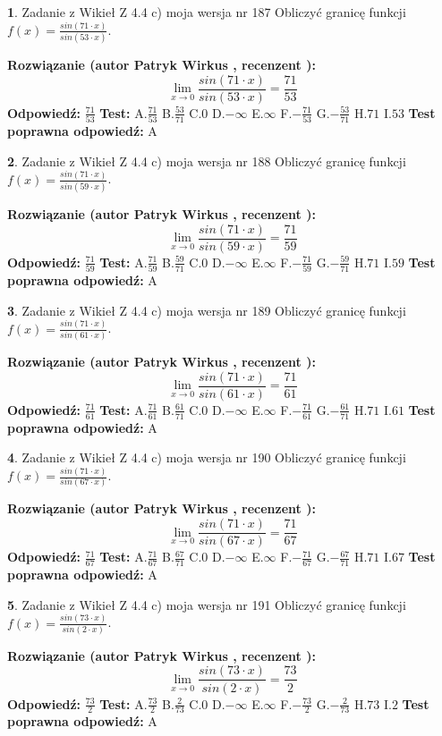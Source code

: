 \documentclass[12pt, a4paper]{article}
\theoremstyle{definition} %
\newtheorem{zad}{}
\newcommand{\zadStart}[1]{\begin{zad}#1\newline}
\newcommand{\zadStop}{\end{zad}}
\newcommand{\rozwStart}[2]{\noindent \textbf{Rozwiązanie (autor #1 , recenzent #2): }\newline}
\newcommand{\rozwStop}{\newline}
\newcommand{\odpStart}{\noindent \textbf{Odpowiedź:}\newline}
\newcommand{\odpStop}{\newline}
\newcommand{\testStart}{\noindent \textbf{Test:}\newline}
\newcommand{\testStop}{\newline}
\newcommand{\kluczStart}{\noindent \textbf{Test poprawna odpowiedź:}\newline}
\newcommand{\kluczStop}{\newline}
\begin{document}
\zadStart{Zadanie z Wikieł Z 4.4 c) moja wersja nr 187}
Obliczyć granicę funkcji $f(x)=\frac{sin(71\cdot x)}{sin(53\cdot x)}$.
\zadStop
\rozwStart{Patryk Wirkus}{}
$$\lim\limits_{x\to 0}\frac{sin(71\cdot x)}{sin(53\cdot x)}=
\frac{71}{53}$$
\rozwStop
\odpStart
$\frac{71}{53}$
\odpStop
\testStart
A.$\frac{71}{53}$
B.$\frac{53}{71}$
C.$0$
D.$-\infty$
E.$\infty$
F.$-\frac{71}{53}$
G.$-\frac{53}{71}$
H.$71$
I.$53$
\testStop
\kluczStart
A
\kluczStop



\zadStart{Zadanie z Wikieł Z 4.4 c) moja wersja nr 188}
Obliczyć granicę funkcji $f(x)=\frac{sin(71\cdot x)}{sin(59\cdot x)}$.
\zadStop
\rozwStart{Patryk Wirkus}{}
$$\lim\limits_{x\to 0}\frac{sin(71\cdot x)}{sin(59\cdot x)}=
\frac{71}{59}$$
\rozwStop
\odpStart
$\frac{71}{59}$
\odpStop
\testStart
A.$\frac{71}{59}$
B.$\frac{59}{71}$
C.$0$
D.$-\infty$
E.$\infty$
F.$-\frac{71}{59}$
G.$-\frac{59}{71}$
H.$71$
I.$59$
\testStop
\kluczStart
A
\kluczStop



\zadStart{Zadanie z Wikieł Z 4.4 c) moja wersja nr 189}
Obliczyć granicę funkcji $f(x)=\frac{sin(71\cdot x)}{sin(61\cdot x)}$.
\zadStop
\rozwStart{Patryk Wirkus}{}
$$\lim\limits_{x\to 0}\frac{sin(71\cdot x)}{sin(61\cdot x)}=
\frac{71}{61}$$
\rozwStop
\odpStart
$\frac{71}{61}$
\odpStop
\testStart
A.$\frac{71}{61}$
B.$\frac{61}{71}$
C.$0$
D.$-\infty$
E.$\infty$
F.$-\frac{71}{61}$
G.$-\frac{61}{71}$
H.$71$
I.$61$
\testStop
\kluczStart
A
\kluczStop



\zadStart{Zadanie z Wikieł Z 4.4 c) moja wersja nr 190}
Obliczyć granicę funkcji $f(x)=\frac{sin(71\cdot x)}{sin(67\cdot x)}$.
\zadStop
\rozwStart{Patryk Wirkus}{}
$$\lim\limits_{x\to 0}\frac{sin(71\cdot x)}{sin(67\cdot x)}=
\frac{71}{67}$$
\rozwStop
\odpStart
$\frac{71}{67}$
\odpStop
\testStart
A.$\frac{71}{67}$
B.$\frac{67}{71}$
C.$0$
D.$-\infty$
E.$\infty$
F.$-\frac{71}{67}$
G.$-\frac{67}{71}$
H.$71$
I.$67$
\testStop
\kluczStart
A
\kluczStop



\zadStart{Zadanie z Wikieł Z 4.4 c) moja wersja nr 191}
Obliczyć granicę funkcji $f(x)=\frac{sin(73\cdot x)}{sin(2\cdot x)}$.
\zadStop
\rozwStart{Patryk Wirkus}{}
$$\lim\limits_{x\to 0}\frac{sin(73\cdot x)}{sin(2\cdot x)}=
\frac{73}{2}$$
\rozwStop
\odpStart
$\frac{73}{2}$
\odpStop
\testStart
A.$\frac{73}{2}$
B.$\frac{2}{73}$
C.$0$
D.$-\infty$
E.$\infty$
F.$-\frac{73}{2}$
G.$-\frac{2}{73}$
H.$73$
I.$2$
\testStop
\kluczStart
A
\kluczStop
\end{document}
